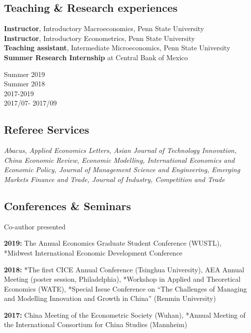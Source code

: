 \documentclass[letterpaper]{article}
\begin{document}
\subsection*{Teaching \& Research experiences}
\begin{minipage}{0.8\textwidth}
  \textbf{Instructor}, Introductory Macroeconomics, Penn State University \\
  \textbf{Instructor}, Introductory Econometrics, Penn State University \\
  \textbf{Teaching assistant}, Intermediate Microeconomics, Penn State University \\
  \textbf{Summer Research Internship} at Central Bank of Mexico
\end{minipage}
\begin{minipage}{0.2\textwidth}
    Summer 2019 \\
    Summer 2018 \\
   2017-2019  \\
  2017/07- 2017/09
\end{minipage}

  \subsection*{Referee Services}
      {\it Abacus, Applied Economics Letters, Asian Journal of Technology Innovation, China Economic Review, Economic Modelling, International Economics and Economic Policy, Journal of Management Science and Engineering, Emerging Markets Finance and Trade, Journal of Industry, Competition and Trade}
      
\subsection*{Conferences \& Seminars}
{\footnotesize * Co-author presented}
\vspace{1em}

\textbf{2019:} The  Annual Economics Graduate Student Conference (WUSTL), *Midwest International Economic Development Conference

\textbf{2018:} *The first CICE Annual Conference (Tsinghua University), AEA Annual Meeting (poster session, Philadelphia), *Workshop in Applied and Theoretical Economics (WATE), *Special Issue Conference on “The Challenges of Managing and Modelling Innovation and Growth in China” (Renmin University)

\textbf{2017:} China Meeting of the Econometric Society (Wuhan), *Annual Meeting of the International Consortium for China Studies (Mannheim)
\end{document}
